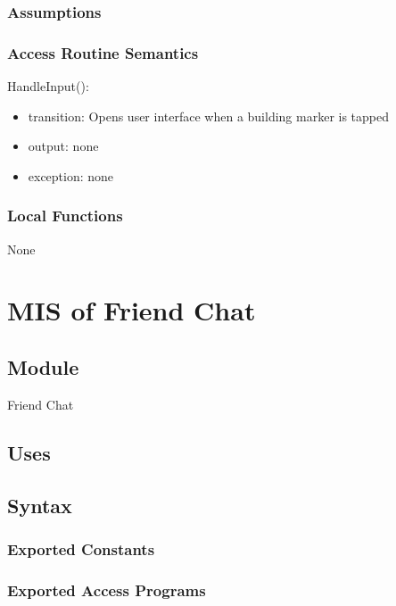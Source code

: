 \documentclass[12pt, titlepage]{article}
\begin{document}
\begin{itemize}
\subsubsection{Assumptions}

\subsubsection{Access Routine Semantics}

\noindent HandleInput():
\begin{itemize}
\item transition: Opens user interface when a building marker is tapped
\item output: none
\item exception: none
\end{itemize}

\subsubsection{Local Functions}

None

\newpage

\section{MIS of Friend Chat} \label{mFC}

\subsection{Module}

Friend Chat

\subsection{Uses}

\subsection{Syntax}

\subsubsection{Exported Constants}

\subsubsection{Exported Access Programs}


\end{itemize}
\end{document}
